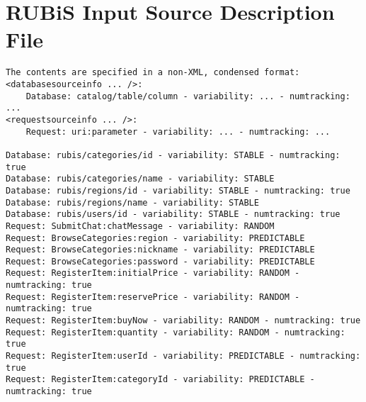 \documentclass[msc,oneside]{ubcthesis}
\begin{document}
\section{RUBiS Input Source Description File}
\label{idf:rubis}
\begin{verbatim}
The contents are specified in a non-XML, condensed format:
<databasesourceinfo ... />:
	Database: catalog/table/column - variability: ... - numtracking: ...
<requestsourceinfo ... />:
	Request: uri:parameter - variability: ... - numtracking: ...

Database: rubis/categories/id - variability: STABLE - numtracking: true
Database: rubis/categories/name - variability: STABLE
Database: rubis/regions/id - variability: STABLE - numtracking: true
Database: rubis/regions/name - variability: STABLE
Database: rubis/users/id - variability: STABLE - numtracking: true
Request: SubmitChat:chatMessage - variability: RANDOM
Request: BrowseCategories:region - variability: PREDICTABLE
Request: BrowseCategories:nickname - variability: PREDICTABLE
Request: BrowseCategories:password - variability: PREDICTABLE
Request: RegisterItem:initialPrice - variability: RANDOM - numtracking: true
Request: RegisterItem:reservePrice - variability: RANDOM - numtracking: true
Request: RegisterItem:buyNow - variability: RANDOM - numtracking: true
Request: RegisterItem:quantity - variability: RANDOM - numtracking: true
Request: RegisterItem:userId - variability: PREDICTABLE - numtracking: true
Request: RegisterItem:categoryId - variability: PREDICTABLE - numtracking: true
\end{verbatim}		
\end{document}
